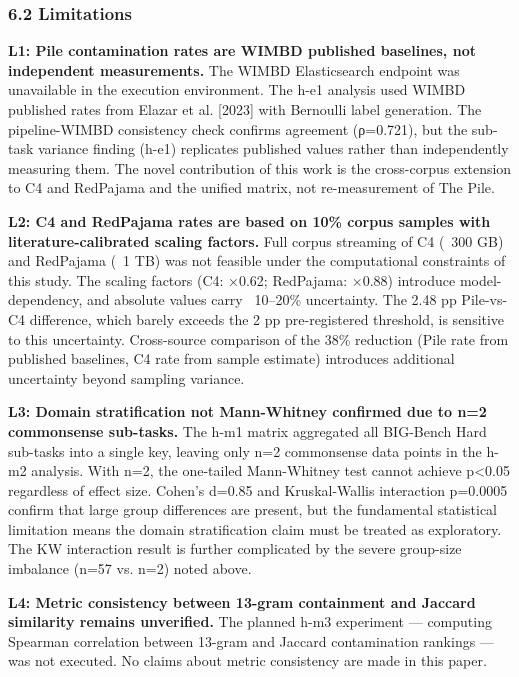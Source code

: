 \subsubsection{6.2 Limitations}

\textbf{L1: Pile contamination rates are WIMBD published baselines, not independent measurements.} The WIMBD Elasticsearch endpoint was unavailable in the execution environment. The h-e1 analysis used WIMBD published rates from Elazar et al. [2023] with Bernoulli label generation. The pipeline-WIMBD consistency check confirms agreement (ρ=0.721), but the sub-task variance finding (h-e1) replicates published values rather than independently measuring them. The novel contribution of this work is the cross-corpus extension to C4 and RedPajama and the unified matrix, not re-measurement of The Pile.

\textbf{L2: C4 and RedPajama rates are based on 10\% corpus samples with literature-calibrated scaling factors.} Full corpus streaming of C4 (~300 GB) and RedPajama (~1 TB) was not feasible under the computational constraints of this study. The scaling factors (C4: ×0.62; RedPajama: ×0.88) introduce model-dependency, and absolute values carry ~10–20\% uncertainty. The 2.48 pp Pile-vs-C4 difference, which barely exceeds the 2 pp pre-registered threshold, is sensitive to this uncertainty. Cross-source comparison of the 38\% reduction (Pile rate from published baselines, C4 rate from sample estimate) introduces additional uncertainty beyond sampling variance.

\textbf{L3: Domain stratification not Mann-Whitney confirmed due to n=2 commonsense sub-tasks.} The h-m1 matrix aggregated all BIG-Bench Hard sub-tasks into a single key, leaving only n=2 commonsense data points in the h-m2 analysis. With n=2, the one-tailed Mann-Whitney test cannot achieve p<0.05 regardless of effect size. Cohen's d=0.85 and Kruskal-Wallis interaction p=0.0005 confirm that large group differences are present, but the fundamental statistical limitation means the domain stratification claim must be treated as exploratory. The KW interaction result is further complicated by the severe group-size imbalance (n=57 vs. n=2) noted above.

\textbf{L4: Metric consistency between 13-gram containment and Jaccard similarity remains unverified.} The planned h-m3 experiment — computing Spearman correlation between 13-gram and Jaccard contamination rankings — was not executed. No claims about metric consistency are made in this paper.

